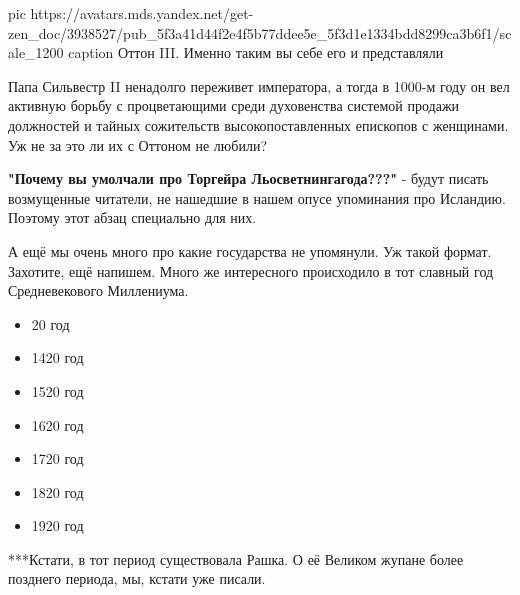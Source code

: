 \ifcmt
pic https://avatars.mds.yandex.net/get-zen_doc/3938527/pub_5f3a41d44f2e4f5b77ddee5e_5f3d1e1334bdd8299ca3b6f1/scale_1200
caption Оттон III. Именно таким вы себе его и представляли
\fi

Папа Сильвестр II ненадолго переживет императора, а тогда в 1000-м году он вел
активную борьбу с процветающими среди духовенства системой продажи должностей и
тайных сожительств высокопоставленных епископов с женщинами. Уж не за это ли их
с Оттоном не любили?

\textbf{"Почему вы умолчали про Торгейра Льосветнингагода???"} - будут писать
возмущенные читатели, не нашедшие в нашем опусе упоминания про Исландию.
Поэтому этот абзац специально для них.

А ещё мы очень много про какие государства не упомянули. Уж такой формат.
Захотите, ещё напишем. Много же интересного происходило в тот славный год
Средневекового Миллениума. 

\begin{itemize}
  \item 20 год
  \item 1420 год
  \item 1520 год
  \item 1620 год
  \item 1720 год
  \item 1820 год
  \item 1920 год
\end{itemize}

***Кстати, в тот период существовала Рашка. О её Великом жупане более позднего
периода, мы, кстати уже писали.

